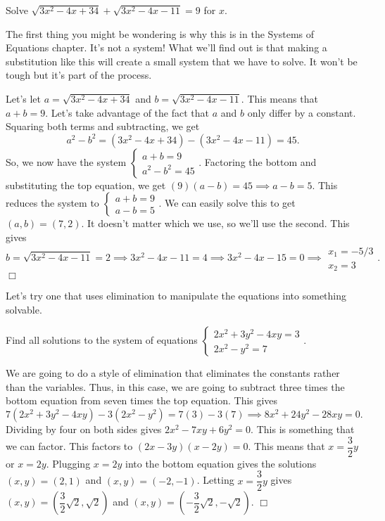 \documentclass[../book.tex]{subfiles}
\begin{document}
\begin{example}
Solve $\sqrt{3x^2-4x+34}+\sqrt{3x^2-4x-11}=9$ for $x$.
\end{example}
\begin{solution}
The first thing you might be wondering is why this is in the Systems of Equations chapter.  It's not a system!  What we'll find out is that making a substitution like this will create a small system that we have to solve.  It won't be tough but it's part of the process.

Let's let $a=\sqrt{3x^2-4x+34}$ and $b=\sqrt{3x^2-4x-11}$.  This means that $a+b=9$.  Let's take advantage of the fact that $a$ and $b$ only differ by a constant.  Squaring both terms and subtracting, we get $$a^2-b^2=(3x^2-4x+34)-(3x^2-4x-11)=45.$$  So, we now have the system $\begin{cases} a+b=9 \\ a^2-b^2=45 \end{cases}$.  Factoring the bottom and substituting the top equation, we get $(9)(a-b)=45 \implies a-b=5$.  This reduces the system to $\begin{cases} a+b=9 \\ a-b=5 \end{cases}$.  We can easily solve this to get $(a,b)=(7,2)$.  It doesn't matter which we use, so we'll use the second.  This gives $$b=\sqrt{3x^2-4x-11}=2 \implies 3x^2-4x-11=4 \implies 3x^2-4x-15=0 \implies \begin{matrix} x_1=-5/3 \\ x_2=3 \end{matrix}.$$$\Box$
\end{solution}
Let's try one that uses elimination to manipulate the equations into something solvable.
\begin{example}
Find all solutions to the system of equations $\begin{cases} 2x^2+3y^2-4xy=3 \\ 2x^2-y^2=7 \end{cases}$.
\end{example}
\begin{solution}
We are going to do a style of elimination that eliminates the constants rather than the variables.  Thus, in this case, we are going to subtract three times the bottom equation from seven times the top equation.  This gives $$7(2x^2+3y^2-4xy)-3(2x^2-y^2)=7(3)-3(7) \implies 8x^2+24y^2-28xy=0.$$  Dividing by four on both sides gives $2x^2-7xy+6y^2=0.$  This is something that we can factor.  This factors to $(2x-3y)(x-2y)=0$.  This means that $x=\dfrac{3}{2}y$ or $x=2y$.  Plugging $x=2y$ into the bottom equation gives the solutions $(x,y)=(2,1)$ and $(x,y)=(-2,-1)$.  Letting $x=\dfrac{3}{2}y$ gives $(x,y)=\left(\dfrac{3}{2}\sqrt{2},\sqrt{2}\right)$ and $(x,y)=\left(-\dfrac{3}{2}\sqrt{2},-\sqrt{2}\right)$.  $\Box$
\end{solution}
\end{document}

